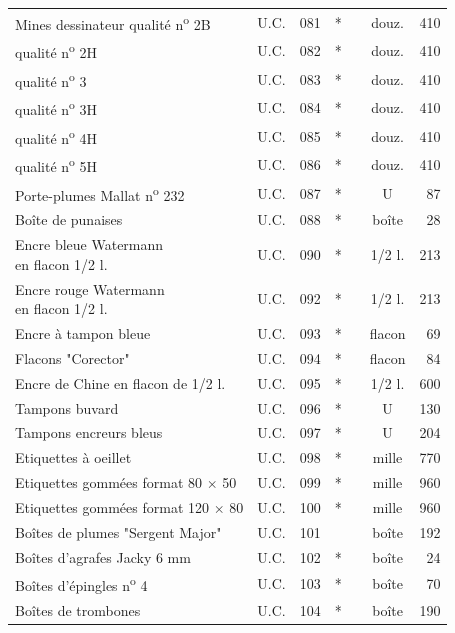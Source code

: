 {{\begin{tabular}{|l|c|r|c|c|c|r|}
Mines dessinateur qualité n\textsuperscript{o} 2B & U.C. & 081 & * &  & douz. & 410 \\
\hspace{7em}qualité n\textsuperscript{o} 2H & U.C. & 082 & * &  & douz. & 410 \\
\hspace{7em}qualité n\textsuperscript{o} 3 & U.C. & 083 & * &  & douz. & 410 \\
\hspace{7em}qualité n\textsuperscript{o} 3H & U.C. & 084 & * &  & douz. & 410 \\
\hspace{7em}qualité n\textsuperscript{o} 4H & U.C. & 085 & * &  & douz. & 410 \\
\hspace{7em}qualité n\textsuperscript{o} 5H & U.C. & 086 & * &  & douz. & 410 \\
Porte-plumes Mallat n\textsuperscript{o} 232 & U.C. & 087 & * &  & U & 87 \\
Boîte de punaises & U.C. & 088 & * &  & boîte & 28 \\
\shortstack[l]{Encre bleue Watermann\\\quad en flacon 1/2 l.} & U.C. & 090 & * &  & 1/2 l. & 213 \\
\shortstack[l]{Encre rouge Watermann\\\quad en flacon 1/2 l.} & U.C. & 092 & * &  & 1/2 l. & 213 \\
Encre à tampon bleue & U.C. & 093 & * &  & flacon & 69 \\
Flacons "Corector" & U.C. & 094 & * &  & flacon & 84 \\
Encre de Chine en flacon de 1/2 l. & U.C. & 095 & * &  & 1/2 l. & 600 \\
Tampons buvard & U.C. & 096 & * &  & U & 130 \\
Tampons encreurs bleus & U.C. & 097 & * &  & U & 204 \\
Etiquettes à oeillet & U.C. & 098 & * &  & mille & 770 \\
Etiquettes gommées format 80 $\times$ 50 & U.C. & 099 & * &  & mille & 960 \\
Etiquettes gommées format 120 $\times$ 80 & U.C. & 100 & * &  & mille & 960 \\
Boîtes de plumes "Sergent Major" & U.C. & 101 &  &  & boîte & 192 \\
Boîtes d'agrafes Jacky 6 mm & U.C. & 102 & * &  & boîte & 24 \\
Boîtes d'épingles n\textsuperscript{o} 4 & U.C. & 103 & * &  & boîte & 70 \\
Boîtes de trombones & U.C. & 104 & * &  & boîte & 190 \\
\end{tabular}}}
